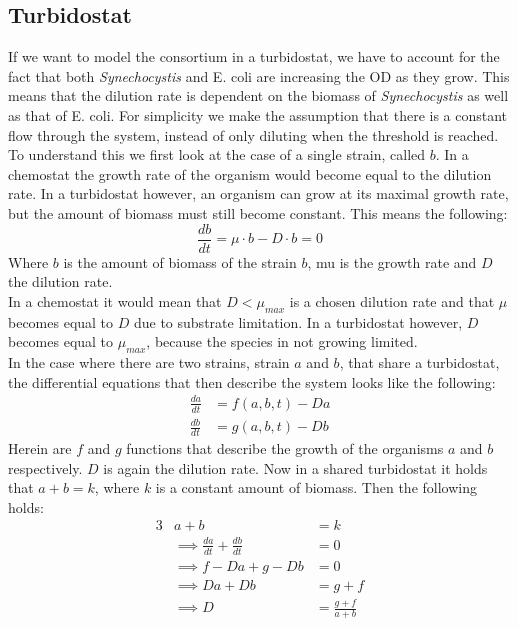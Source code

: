 \documentclass[12pt]{report}
\begin{document}
\subsection{Turbidostat}\label{sec:turb}
If we want to model the consortium in a turbidostat, we have to account for the fact that both \textit{Synechocystis} and E. coli are increasing the OD as they grow. This means that the dilution rate is dependent on the biomass of \textit{Synechocystis} as well as that of E. coli.
For simplicity we make the assumption that there is a constant flow through the system, instead of only diluting when the threshold is reached.  To understand this we first look at the case of a single strain, called $b$. In a chemostat the growth rate of the organism would become equal to the dilution rate. In a turbidostat however, an organism can grow at its maximal growth rate, but the amount of biomass must still become constant. This means the following:
\begin{equation}
 \frac{db}{dt} = \mu \cdot b - D \cdot b = 0
\end{equation}
Where $b$ is the amount of biomass of the strain $b$, mu is the growth rate and $D$ the dilution rate.\\
In a chemostat it would mean that $D<\mu_{max}$ is a chosen dilution rate and that $\mu$ becomes equal to $D$ due to substrate limitation. In a turbidostat however, $D$ becomes equal to $\mu_{max}$, because the species in not growing limited.\\
In the case where there are two strains, strain $a$ and $b$, that share a turbidostat, the differential equations that then describe the system looks like the following:
\begin{align}
 \frac{da}{dt} &= f(a,b,t) - Da\\
 \frac{db}{dt} &= g(a,b,t) - Db
\end{align}
Herein are $f$ and $g$ functions that describe the growth of the organisms $a$ and $b$ respectively. $D$ is again the dilution rate. Now in a shared turbidostat it holds that $a+b=k$, where $k$ is a constant amount of biomass. Then the following holds:
\begin{alignat}{3}
 & a+b &= k \\
 &\implies \frac{da}{dt} + \frac{db}{dt} &= 0\\
 &\implies f - Da + g - Db & = 0\\
 &\implies Da + Db &= g + f \\
 &\implies D &= \frac{g + f}{a+b}
\end{alignat}
\end{document}
